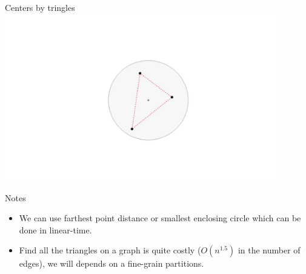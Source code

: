 \documentclass{beamer}
\begin{document}
\begin{frame}{Centers by tringles}
  \centering
  \includegraphics[width=0.9\textwidth]{figures/triangle4}
\end{frame}

\begin{frame}{Notes}
    \begin{itemize}
        \item We can use farthest point distance or smallest enclosing circle which can be done in linear-time.
        \item Find all the triangles on a graph is quite costly ($O(n^{1.5})$ in the number of edges), we will depends on a fine-grain partitions.
    \end{itemize}

\end{frame}
\end{document}
